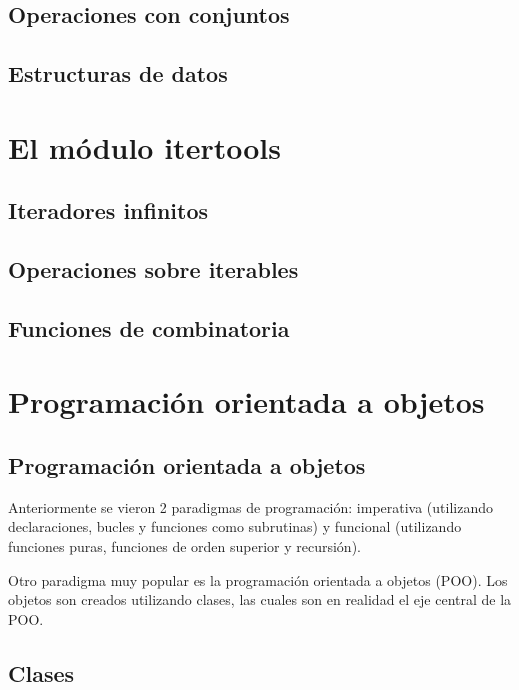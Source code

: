 \documentclass{report}
\begin{document}
\section{Operaciones con conjuntos}

\section{Estructuras de datos}

\clearpage\chapter{El módulo itertools}

\section{Iteradores infinitos}

\section{Operaciones sobre iterables}

\section{Funciones de combinatoria}

\clearpage\chapter{Programación orientada a objetos}


\section{Programación orientada a objetos}

Anteriormente se vieron 2 paradigmas de programación: imperativa (utilizando declaraciones, bucles y funciones como subrutinas) y funcional (utilizando funciones puras, funciones de orden superior y recursión).

Otro paradigma muy popular es la programación orientada a objetos (POO). Los objetos son creados utilizando clases, las cuales son en realidad el eje central de la POO.

\section{Clases}
\end{document}
